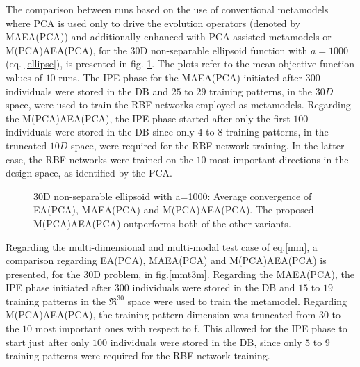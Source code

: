 The comparison between  runs based on the use of conventional metamodels where PCA is used only to drive the evolution operators (denoted by MAEA(PCA)) and additionally enhanced with PCA-assisted metamodels  or M(PCA)AEA(PCA), for the 30D non-separable ellipsoid function with $a=1000$ (eq. \ref{ellipse}), is presented in fig. \ref{Ellt3-m}. The plots refer to the mean objective function values of $10$ runs. The IPE phase for the MAEA(PCA) initiated after $300$ individuals were stored in the DB and $25$ to $29$ training patterns, in the $30D$ space, were used to train the RBF networks employed as metamodels. Regarding the M(PCA)AEA(PCA), the IPE phase started after only the first $100$ individuals were stored in the DB since only $4$ to $8$ training patterns, in the truncated  $10D$  space, were required for the RBF network training. In the latter case, the RBF networks were trained on the $10$ most important directions in the design space, as identified by the PCA. 

\begin{figure}[h!]
\begin{minipage}[b]{1\linewidth}
 \centering
\end{minipage}
\caption{30D non-separable ellipsoid with a=1000: Average convergence of EA(PCA), MAEA(PCA) and M(PCA)AEA(PCA). The proposed M(PCA)AEA(PCA) outperforms both of the other variants.} 
\label{Ellt3-m}
\end{figure}


Regarding the multi-dimensional and multi-modal test case of eq.\ref{mm}, a comparison regarding EA(PCA), MAEA(PCA) and M(PCA)AEA(PCA) is presented, for the 30D  problem, in fig.\ref{mmt3m}. Regarding the MAEA(PCA), the  IPE phase initiated after $300$ individuals were stored in the DB and $15$ to $19$ training patterns in the $\Re^{30}$ space were used to train the  metamodel. Regarding M(PCA)AEA(PCA), the training pattern dimension was truncated from $30$ to the $10$ most important ones with respect to f. This allowed for the  IPE phase to start just after only $100$ individuals were stored in the DB, since only $5$ to $9$ training patterns were required for the RBF network training.


